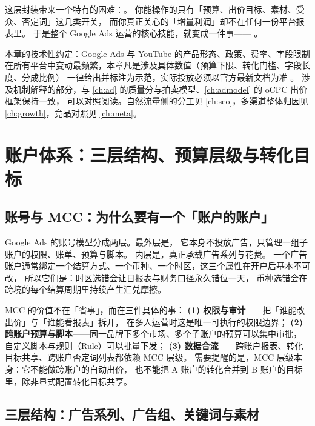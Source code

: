 这层封装带来一个特有的困难：。
你能操作的只有「预算、出价目标、素材、受众、否定词」这几类开关，
而你真正关心的「增量利润」却不在任何一份平台报表里。
于是整个 Google Ads 运营的核心技能，就变成一件事——
。

本章的技术性约定：Google Ads 与 YouTube 的产品形态、政策、费率、字段限制
在所有平台中变动最频繁，本章凡是涉及具体数值（预算下限、转化门槛、字段长度、分成比例）
一律给出并标注为示范，实际投放必须以官方最新文档为准 \cite{googleads_help}。
涉及机制解释的部分，与 \cref{ch:ad} 的质量分与拍卖模型、\cref{ch:admodel} 的 oCPC 出价框架保持一致，
可以对照阅读。自然流量侧的分工见 \cref{ch:seo}，多渠道整体归因见 \cref{ch:growth}，竞品对照见 \cref{ch:meta}。

\section{账户体系：三层结构、预算层级与转化目标}
\label{sec:g-account}

\subsection{账号与 MCC：为什么要有一个「账户的账户」}

Google Ads 的账号模型分成两层。最外层是，
它本身不投放广告，只管理一组子账户的权限、账单、预算与脚本。
内层是，真正承载广告系列与花费。
一个广告账户通常绑定一个结算方式、一个币种、一个时区，这三个属性在开户后基本不可改，
所以它们是：时区选错会让日报表与财务口径永久错位一天，
币种选错会在跨境的每个结算周期里持续产生汇兑摩擦。

MCC 的价值不在「省事」，而在三件具体的事：
\textbf{(1) 权限与审计}——把「谁能改出价」与「谁能看报表」拆开，
在多人运营时这是唯一可执行的权限边界；
\textbf{(2) 跨账户预算与脚本}——同一品牌下多个市场、多个子账户的预算可以集中审批，
自定义脚本与规则（Rule）可以批量下发；
\textbf{(3) 数据合流}——跨账户报表、转化目标共享、跨账户否定词列表都依赖 MCC 层级。
需要提醒的是，MCC 层级本身：它不能做跨账户的自动出价，
也不能把 A 账户的转化合并到 B 账户的目标里，除非显式配置转化目标共享。

\subsection{三层结构：广告系列、广告组、关键词与素材}

